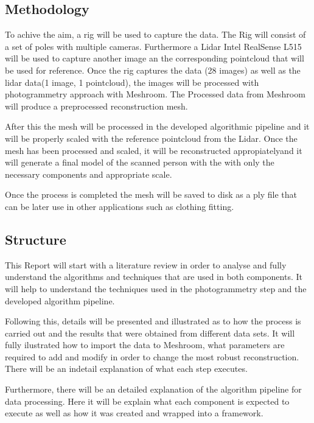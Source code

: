 \documentclass[12pt]{report}
\begin{document}
\subsection{Methodology}
To achive the aim, a rig will be used to capture the data. The Rig will consist of a set of poles with multiple cameras. Furthermore a Lidar Intel RealSense L515 will be used to capture another image an the corresponding pointcloud that will be used for reference.
Once the rig captures the data (28 images) as well as the lidar data(1 image, 1 pointcloud), the images will be processed with photogrammetry approach with Meshroom. 
The Processed data from Meshroom will produce a preprocessed reconstruction mesh. 

After this the mesh will be processed in the developed algorithmic pipeline and it will be properly scaled with the reference pointcloud from the Lidar. 
Once the mesh has been processed and scaled, it will be reconstructed appropiatelyand it will generate a final model of the scanned person with the with only the necessary components and appropriate scale.

Once the process is completed the mesh will be saved to disk as a ply file that can be later use in other applications such as clothing fitting. 

\subsection{Structure}
This Report will start with a literature review in order to analyse and fully understand the algorithms and techniques that are used in both components. 
It will help to understand the techniques used in the photogrammetry step and the developed algorithm pipeline.

Following this, details will be presented and illustrated as to how the process is carried out and the results that were obtained from different data sets.
It will fully ilustrated how to import the data to Meshroom, what parameters are required to add and modify in order to change the most robust reconstruction. There will be an indetail explanation of what each step executes.

Furthermore, there will be an detailed explanation of the algorithm pipeline for data processing. Here it will be explain what each component is expected to execute as well as how it was created and wrapped into a framework.
\end{document}
